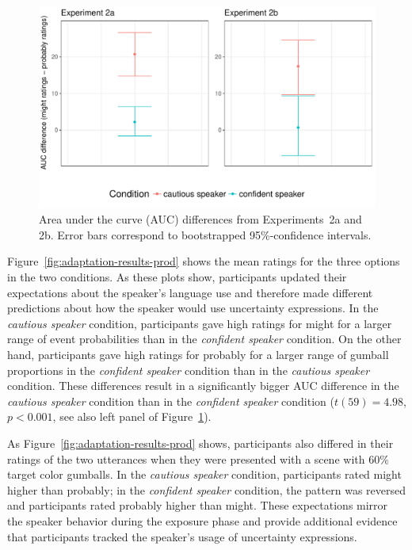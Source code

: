 \documentclass[man, floatsintext]{apa6}
\begin{document}
\begin{figure}
\center
\includegraphics[width=.75\textwidth]{plots/exp-1-aucs.pdf}
\caption{Area under the curve (AUC) differences from Experiments~2a and 2b. Error bars correspond to bootstrapped 95\%-confidence intervals.  \label{fig:adaptation-auc-prod}}
\end{figure}

Figure~\ref{fig:adaptation-results-prod} shows the mean ratings for the three options in the two conditions. As these plots show, participants updated their expectations about the speaker's language use and therefore made different predictions about how the speaker would use uncertainty expressions. In the \emph{cautious speaker} condition, participants gave high ratings for {\sc might} for a larger range of event probabilities than in the \emph{confident speaker} condition. On the other hand, participants gave high ratings for {\sc probably} for a larger range of gumball proportions in the \emph{confident speaker} condition than in the \emph{cautious speaker} condition. These differences result in a significantly bigger AUC difference in the \emph{cautious speaker} condition than in the \emph{confident speaker} condition ($t(59) = 4.98$, $p < 0.001$, see also left panel of Figure~\ref{fig:adaptation-auc-prod}).

As Figure~\ref{fig:adaptation-results-prod} shows, participants also differed in their ratings of the two utterances when they were presented with a scene with 60\% target color gumballs. In the \emph{cautious speaker} condition, participants rated {\sc might} higher than {\sc probably}; in the \emph{confident speaker} condition, the pattern was reversed and participants rated {\sc probably} higher than {\sc might}. These expectations mirror the speaker behavior during the exposure phase and provide additional evidence that participants tracked the speaker's usage of uncertainty expressions. 
\end{document}
